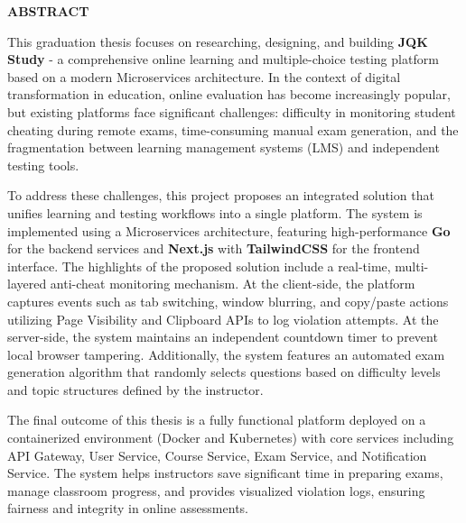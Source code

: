 \documentclass[../DoAn.tex]{subfiles}
\begin{document}
\begin{center}
    \Large{\textbf{ABSTRACT}}\\
\end{center}
\vspace{1cm}

This graduation thesis focuses on researching, designing, and building \textbf{JQK Study} - a comprehensive online learning and multiple-choice testing platform based on a modern Microservices architecture. In the context of digital transformation in education, online evaluation has become increasingly popular, but existing platforms face significant challenges: difficulty in monitoring student cheating during remote exams, time-consuming manual exam generation, and the fragmentation between learning management systems (LMS) and independent testing tools.

To address these challenges, this project proposes an integrated solution that unifies learning and testing workflows into a single platform. The system is implemented using a Microservices architecture, featuring high-performance \textbf{Go} for the backend services and \textbf{Next.js} with \textbf{TailwindCSS} for the frontend interface. The highlights of the proposed solution include a real-time, multi-layered anti-cheat monitoring mechanism. At the client-side, the platform captures events such as tab switching, window blurring, and copy/paste actions utilizing Page Visibility and Clipboard APIs to log violation attempts. At the server-side, the system maintains an independent countdown timer to prevent local browser tampering. Additionally, the system features an automated exam generation algorithm that randomly selects questions based on difficulty levels and topic structures defined by the instructor.

The final outcome of this thesis is a fully functional platform deployed on a containerized environment (Docker and Kubernetes) with core services including API Gateway, User Service, Course Service, Exam Service, and Notification Service. The system helps instructors save significant time in preparing exams, manage classroom progress, and provides visualized violation logs, ensuring fairness and integrity in online assessments.
\end{document}
